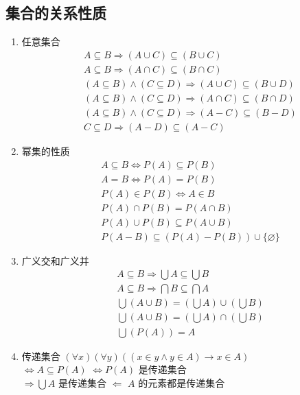 \documentclass[11pt,a4paper,twocolumn,fleqn]{article} %
\renewcommand{\emptyset}{\varnothing}
\begin{document}
\subsection{集合的关系性质} %
\label{sub:set_relation}
\begin{enumerate}
	\item 任意集合
	\begin{align*}
		&A\subseteq B \Rightarrow (A\cup C)\subseteq (B\cup C) \\
		&A\subseteq B \Rightarrow (A\cap C)\subseteq (B\cap C) \\
		&(A\subseteq B) \land (C\subseteq D) 
		\Rightarrow (A\cup C)\subseteq(B\cup D)  \\
		&(A\subseteq B) \land (C\subseteq D) 
		\Rightarrow (A\cap C)\subseteq(B\cap D)  \\
		&(A\subseteq B) \land (C\subseteq D) 
		\Rightarrow (A - C)\subseteq(B - D)  \\
		&C\subseteq D \Rightarrow (A - D) \subseteq (A - C)
	\end{align*}
	\item 幂集的性质
	\begin{align*}
		&A\subseteq B \Leftrightarrow P(A) \subseteq P(B) \\
		&A = B \Leftrightarrow P(A) = P(B) \\
		&P(A) \in P(B) \Leftrightarrow A \in B \\
		&P(A) \cap P(B) = P(A\cap B) \\
		&P(A)\cup P(B) \subseteq P(A\cup B) \\
		&P(A-B)\subseteq (P(A)-P(B))\cup\{\emptyset\}
	\end{align*}
	\item 广义交和广义并
	\begin{align*}
		&A\subseteq B \Rightarrow \bigcup A \subseteq \bigcup B\\
		&A\subseteq B \Rightarrow \bigcap B \subseteq \bigcap A\\
		&\bigcup(A\cup B) = (\bigcup A)\cup(\bigcup B) \\
		&\bigcup(A\cup B) = (\bigcup A)\cap(\bigcup B) \\
		&\bigcup(P(A)) = A
	\end{align*}
	\item 传递集合 $(\forall x)(\forall y)((x\in y\land y\in A)\to x\in A)$\\
	$\Leftrightarrow A\subseteq P(A)$ 
	$\Leftrightarrow P(A)$ 是传递集合 \\
	$\Rightarrow \bigcup A$ 是传递集合 $\Leftarrow$ $A$ 的元素都是传递集合 \\

\end{enumerate}
\end{document}
